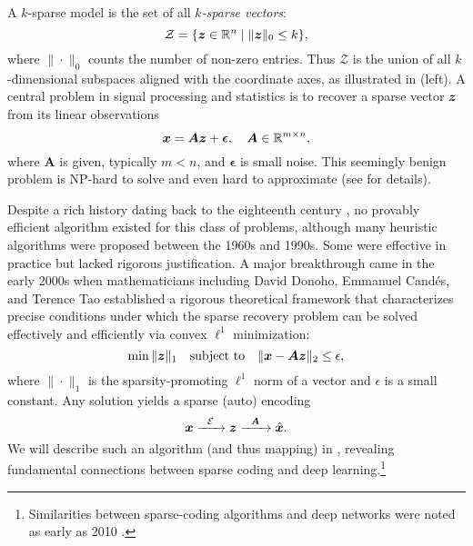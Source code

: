 \documentclass[../../book-main.tex]{subfiles}
\begin{document}
A $k$-sparse model is the set of all \textit{$k$-sparse vectors}:
\begin{equation}
    \mathcal{Z} = \{\bm{z} \in \mathbb{R}^n \mid \|\bm{z}\|_0 \le k\},
\end{equation}
where $\|\cdot\|_0$ counts the number of non-zero entries. Thus $\mathcal{Z}$ is the union of all $k$-dimensional subspaces aligned with the coordinate axes, as illustrated in  (left). A central problem in signal processing and statistics is to recover a sparse vector $\bm{z}$ from its linear observations
\begin{equation}
    \bm{x} = \boldsymbol{A} \bm{z} + \boldsymbol{\epsilon}, \quad \boldsymbol{A} \in \mathbb{R}^{m\times n},
    \label{eqn:sparse-model}
\end{equation}
where $\boldsymbol{A}$ is given, typically $m < n$, and $\boldsymbol{\epsilon}$ is small noise. This seemingly benign problem is NP-hard to solve and even hard to approximate (see \cite{Wright-Ma-2022} for details).

Despite a rich history dating back to the eighteenth century \cite{Boscovichca1750}, no provably efficient algorithm existed for this class of problems, although many heuristic algorithms were proposed between the 1960s and 1990s. Some were effective in practice but lacked rigorous justification. A major breakthrough came in the early 2000s when mathematicians including David Donoho, Emmanuel Cand\'{e}s, and Terence Tao \cite{donoho2005neighborly,Candes2005,CandesE2005-IT} established a rigorous theoretical framework that characterizes precise conditions under which the sparse recovery problem can be solved effectively and efficiently via convex $\ell^1$ minimization:
\begin{equation}
    \min \|\bm{z}\|_1 \quad \text{subject to} \quad \|\bm{x} - \boldsymbol{A}\bm{z}\|_2 \le \epsilon,
\end{equation}
where $\|\cdot\|_1$ is the sparsity-promoting $\ell^1$ norm of a vector and $\epsilon$ is a small constant. Any solution yields a sparse (auto) encoding 
\begin{equation}
    \bm{x} \xrightarrow{\hspace{2mm} \mathcal{E} \hspace{2mm}} \bm{z} \xrightarrow{\hspace{2mm} \boldsymbol{A} \hspace{2mm}} \hat {\bm{x}}.
    \label{eqn:decoding-sparse}
\end{equation}
We will describe such an algorithm (and thus mapping) in , revealing fundamental connections between sparse coding and deep learning.\footnote{Similarities between sparse-coding algorithms and deep networks were noted as early as 2010 \cite{gregor2010learning}.}
\end{document}
